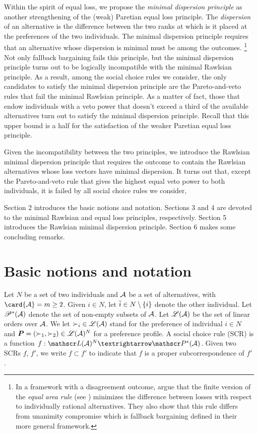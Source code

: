 \documentclass[version=3.21, pagesize, twoside=off, bibliography=totoc, DIV=calc, fontsize=12pt, a4paper]{scrartcl}
\begin{document}
Within the spirit of equal loss, we propose the \textit{minimal dispersion principle} as another strengthening of the (weak) Paretian equal loss principle. The \textit{dispersion} of an alternative is the difference between the two ranks at which is it placed at the preferences of the two individuals. The minimal dispersion principle requires that an alternative whose dispersion is minimal must be among the outcomes. \footnote{
In a framework with a disagreement outcome, \cite{KibrisSertel2007} argue that the finite version of the \textit{equal area rule} (see \cite{thomson1994cooperative}) minimizes the difference between losses with respect to individually rational alternatives. They also show that this rule differs from unanimity compromise which is fallback bargaining defined in their more general framework.} Not only fallback bargaining fails this principle, but the minimal dispersion principle turns out to be logically incompatible with the minimal Rawlsian principle. As a result, among the social choice rules we consider, the only candidates to satisfy the minimal dispersion principle are the Pareto-and-veto rules that fail the minimal Rawlsian principle. As a matter of fact, those that endow individuals with a veto power that doesn't exceed a third of the available alternatives turn out to satisfy the minimal dispersion principle. Recall that this upper bound is a half for the satisfaction of the weaker Paretian equal loss principle.

Given the incompatibility between the two principles, we introduce the Rawlsian minimal dispersion principle that requires the outcome to contain the Rawlsian alternatives whose loss vectors have minimal dispersion. It turns out that, except the Pareto-and-veto rule that gives the highest equal veto power to both individuals, it is failed by all social choice rules we consider,

Section 2 introduces the basic notions and notation. Sections 3 and 4 are devoted to the minimal Rawlsian and equal loss principles, respectively. Section 5 introduces the Rawlsian minimal dispersion principle. Section 6 makes some concluding remarks.



\section{Basic notions and notation}

Let $N$ be a set of two individuals and $\mathcal{A}$ be a set of alternatives, with $\card{\allalts} = m\geq 2$. 
Given $i \in N$, let $\overline{i} \in N \setminus \{i\}$ denote the other individual. Let $\mathscr{P}^*(\mathcal{A})$ denote the set of non-empty subsets of $\mathcal{A}$. Let $\mathscr{L}(\mathcal{A})$ be the set of linear orders over $\mathcal{A}$. We let ${\prefi} \in \linors$ stand for the preference of individual  $i \in N$ and $\prof = ({\prefi[1]}, {\prefi[2]}) \in \allprofs$ for a preference profile. 
A social choice rule (SCR) is a function $f: \allprofs → \powersetz{\allalts}$.
Given two SCRs $f$, $f'$, we write $f \subset f'$ to indicate that $f$ is a proper subcorrespondence of $f'$.
\end{document}
